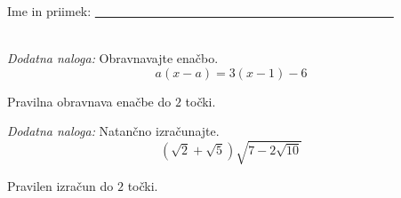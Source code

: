 \documentclass[addpoints]{exam}
\begin{document}
\begin{questions}






     \newpage

     \noindent Ime in priimek: \underline{~~~~~~~~~~~~~~~~~~~~~~~~~~~~~~~~~~~~~~~~~~~~~~~~}

     ~\\

    \bonusquestion[2]
    \textit{Dodatna naloga:} Obravnavajte enačbo. $$a(x-a)=3(x-1)-6$$

    \begin{solution}[10cm]
        Pravilna obravnava enačbe do $2$ točki.
    \end{solution}




        

    \bonusquestion[2]
    \textit{Dodatna naloga:} Natančno izračunajte. $$ \left(\sqrt{2}+\sqrt{5}\right)\sqrt{7-2\sqrt{10}} $$

    \begin{solution}[7cm]
        Pravilen izračun do $2$ točki.
   \end{solution}




\end{questions}
\end{document}
